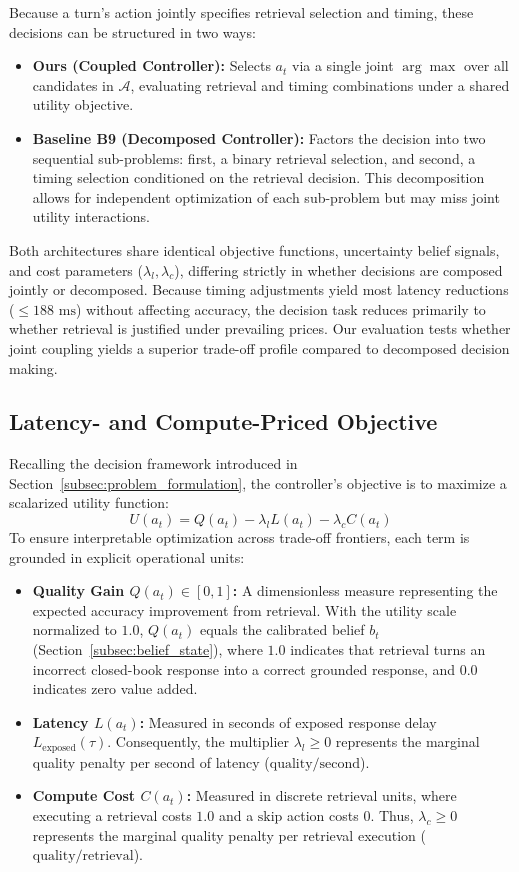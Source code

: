 Because a turn's action jointly specifies retrieval selection and timing, these decisions can be structured in two ways:
\begin{itemize}
    \item \textbf{Ours (Coupled Controller):} Selects $a_t$ via a single joint $\arg\max$ over all candidates in $\mathcal{A}$, evaluating retrieval and timing combinations under a shared utility objective.
    \item \textbf{Baseline B9 (Decomposed Controller):} Factors the decision into two sequential sub-problems: first, a binary retrieval selection, and second, a timing selection conditioned on the retrieval decision. This decomposition allows for independent optimization of each sub-problem but may miss joint utility interactions.
\end{itemize}
Both architectures share identical objective functions, uncertainty belief signals, and cost parameters ($\lambda_l, \lambda_c$), differing strictly in whether decisions are composed jointly or decomposed. Because timing adjustments yield most latency reductions ($\le 188\text{ ms}$) without affecting accuracy, the decision task reduces primarily to whether retrieval is justified under prevailing prices. Our evaluation tests whether joint coupling yields a superior trade-off profile compared to decomposed decision making.

\subsection{Latency- and Compute-Priced Objective}
\label{subsec:priced_objective}

Recalling the decision framework introduced in Section~\ref{subsec:problem_formulation}, the controller's objective is to maximize a scalarized utility function:
\begin{equation}
    U(a_t) = Q(a_t) - \lambda_l L(a_t) - \lambda_c C(a_t)
\end{equation}
To ensure interpretable optimization across trade-off frontiers, each term is grounded in explicit operational units:
\begin{itemize}
    \item \textbf{Quality Gain $Q(a_t) \in [0, 1]$:} A dimensionless measure representing the expected accuracy improvement from retrieval. With the utility scale normalized to $1.0$, $Q(a_t)$ equals the calibrated belief $b_t$ (Section~\ref{subsec:belief_state}), where $1.0$ indicates that retrieval turns an incorrect closed-book response into a correct grounded response, and $0.0$ indicates zero value added.
    \item \textbf{Latency $L(a_t)$:} Measured in seconds of exposed response delay $L_{\text{exposed}}(\tau)$. Consequently, the multiplier $\lambda_l \ge 0$ represents the marginal quality penalty per second of latency ($\text{quality}/\text{second}$).
    \item \textbf{Compute Cost $C(a_t)$:} Measured in discrete retrieval units, where executing a retrieval costs $1.0$ and a $\text{skip}$ action costs $0$. Thus, $\lambda_c \ge 0$ represents the marginal quality penalty per retrieval execution ($\text{quality}/\text{retrieval}$).
\end{itemize}

